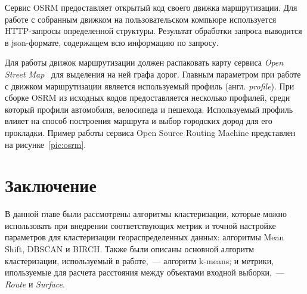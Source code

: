 Сервис OSRM предоставляет открытый код своего движка маршрутизации. Для работе с собранным движком на пользовательском компьюре используется HTTP-запросы определенной структуры. Результат обработки запроса выводится в json-формате, содержащем всю информацию по запросу.

Для работы движок маршрутизации должен распаковать карту сервиса \emph{Open Street Map}~\cite{OSM} для выделения на ней графа дорог. Главным параметром при работе с движком маршрутизации является используемый профиль (англ. \emph{profile}). При сборке OSRM из исходных кодов предоставляется несколько профилей, среди который профили автомобиля, велосипеда и пешехода. Используемый профиль влияет на способ построения маршрута и выбор городских дород для его прокладки. Пример работы сервиса Open Source Routing Machine представлен на рисунке~\ref{pic:osrm}.

\section{Заключение}
В данной главе были рассмотрены алгоритмы кластеризации, которые можно использовать при внедрении соответствующих метрик и точной настройке параметров для кластеризации геораспределенных данных: алгоритмы Mean Shift, DBSCAN и BIRCH. Также были описаны основной алгоритм кластеризации, используемый в работе,~--- алгоритм k-means; и метрики, ипользуемые для расчета расстояния между объектами входной выборки,~--- \emph{Route} и \emph{Surface}.
